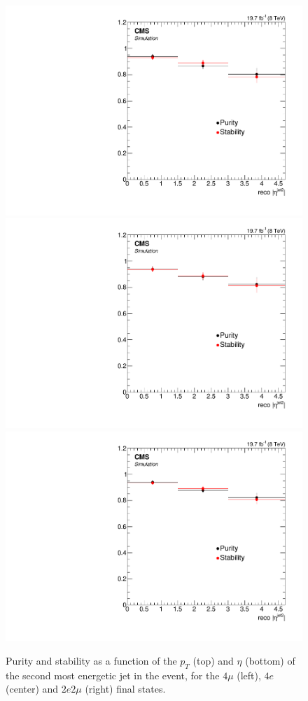 \begin{figure}[hbtp]
\begin{center}
    \includegraphics[width=0.8\cmsFigWidth]{Figures/Unfolding/BinMigration/PurityStability_4m_EtaJet2_Mad}
    \includegraphics[width=0.8\cmsFigWidth]{Figures/Unfolding/BinMigration/PurityStability_4e_EtaJet2_Mad}
    \includegraphics[width=0.8\cmsFigWidth]{Figures/Unfolding/BinMigration/PurityStability_2e2m_EtaJet2_Mad}
 \caption{Purity and stability as a function of the $p_T$ (top) and $\eta$ (bottom) of the second most energetic jet in the event,  for the $4\mu$ (left), $4e$ (center) and $2e2\mu$ (right) final states.}
    \label{fig:ps_jet2}
  \end{center}
\end{figure}

